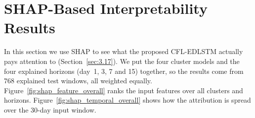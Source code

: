 





\section{SHAP-Based Interpretability Results}
\label{sec:4.9}
\label{sec:shap_results}

In this section we use SHAP to see what the proposed CFL-EDLSTM actually pays
attention to (Section~\ref{sec:3.17}). We put the four cluster models and the
four explained horizons (day~1, 3, 7 and 15) together, so the results come from
768 explained test windows, all weighted equally.
Figure~\ref{fig:shap_feature_overall} ranks the input features over all clusters
and horizons. Figure~\ref{fig:shap_temporal_overall} shows how the attribution is
spread over the 30-day input window.

